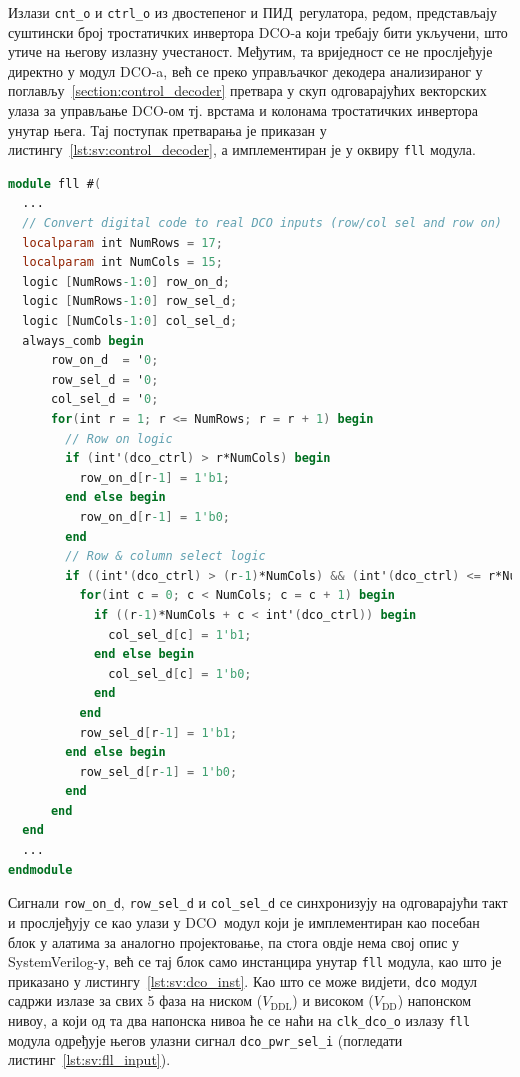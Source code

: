 \documentclass[master]{finthesis}
\newcommand*{\prog}[1]{\texttt{#1}}
\def \DCO  {DCO} %
\def \PID  {ПИД} %
\begin{document}
Излази \prog{cnt\_o} и \prog{ctrl\_o} из двостепеног и \PID\ регулатора, редом, представљају суштински број тростатичких инвертора \DCO-а који требају бити укључени, што утиче на његову излазну учестаност. Међутим, та вриједност се не прослјеђује директно у модул \DCO-a, већ се преко управљачког декодера анализираног у поглављу~\ref{section:control_decoder} претвара у скуп одговарајућих векторских улаза за управљање \DCO-ом тј. врстама и колонама тростатичких инвертора унутар њега. Тај поступак претварања је приказан у листингу~\ref{lst:sv:control_decoder}, а имплементиран је у оквиру \prog{fll} модула. \par
\begin{lstlisting}[language=Verilog, caption={Имплементација управљачког декодера из поглавља~\ref{section:control_decoder}.}, label={lst:sv:control_decoder}]
module fll #(
  ...
  // Convert digital code to real DCO inputs (row/col sel and row on)
  localparam int NumRows = 17;
  localparam int NumCols = 15;
  logic [NumRows-1:0] row_on_d;
  logic [NumRows-1:0] row_sel_d;
  logic [NumCols-1:0] col_sel_d;
  always_comb begin
      row_on_d  = '0;
      row_sel_d = '0;
      col_sel_d = '0;
      for(int r = 1; r <= NumRows; r = r + 1) begin
        // Row on logic
        if (int'(dco_ctrl) > r*NumCols) begin
          row_on_d[r-1] = 1'b1;
        end else begin
          row_on_d[r-1] = 1'b0;
        end
        // Row & column select logic
        if ((int'(dco_ctrl) > (r-1)*NumCols) && (int'(dco_ctrl) <= r*NumCols)) begin
          for(int c = 0; c < NumCols; c = c + 1) begin
            if ((r-1)*NumCols + c < int'(dco_ctrl)) begin
              col_sel_d[c] = 1'b1;
            end else begin
              col_sel_d[c] = 1'b0;
            end
          end
          row_sel_d[r-1] = 1'b1;
        end else begin
          row_sel_d[r-1] = 1'b0;
        end
      end
  end
  ...
endmodule
\end{lstlisting}
Сигнали \prog{row\_on\_d}, \prog{row\_sel\_d} и \prog{col\_sel\_d} се синхронизују на одговарајући такт и прослјеђују се као улази у \DCO\ модул који је имплементиран као посебан блок у алатима за аналогно пројектовање, па стога овдје нема свој опис у SystemVerilog-у, већ се тај блок само инстанцира унутар \prog{fll} модула, као што је приказано у листингу~\ref{lst:sv:dco_inst}. Као што се може видјети, \prog{dco} модул садржи излазе за свих 5 фаза на ниском ($V_\text{DDL}$) и високом ($V_\text{DD}$) напонском нивоу, а који од та два напонска нивоа ће се наћи на \prog{clk\_dco\_o} излазу \prog{fll} модула одређује његов улазни сигнал \prog{dco\_pwr\_sel\_i} (погледати листинг~\ref{lst:sv:fll_input}). \par 
\end{document}

